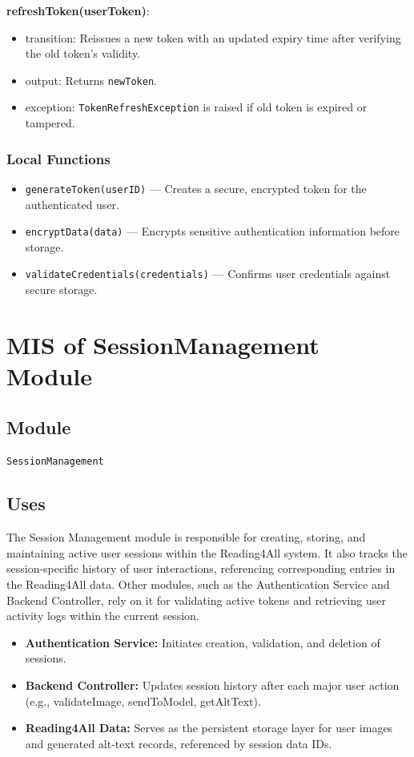 \documentclass[12pt, titlepage]{article}
\begin{document}
\noindent \textbf{refreshToken(userToken)}:
\begin{itemize}
  \item transition: Reissues a new token with an updated expiry time
    after verifying the old token’s validity.
  \item output: Returns \texttt{newToken}.
  \item exception: \texttt{TokenRefreshException} is raised if old
    token is expired or tampered.
\end{itemize}

\subsubsection{Local Functions}
\begin{itemize}
  \item \texttt{generateToken(userID)} — Creates a secure, encrypted
    token for the authenticated user.
  \item \texttt{encryptData(data)} — Encrypts sensitive
    authentication information before storage.
  \item \texttt{validateCredentials(credentials)} — Confirms user
    credentials against secure storage.
\end{itemize}

\section{MIS of SessionManagement Module} \label{Module:SessionManagement}

\subsection{Module}
\texttt{SessionManagement}

\subsection{Uses}
The Session Management module is responsible for creating, storing,
and maintaining active user sessions within the Reading4All system.
It also tracks the session-specific history of user interactions,
referencing corresponding entries in the Reading4All data. Other
modules, such as the Authentication Service and Backend Controller,
rely on it for validating active tokens and retrieving user activity
logs within the current session.
\begin{itemize}
  \item \textbf{Authentication Service:} Initiates creation,
    validation, and deletion of sessions.
  \item \textbf{Backend Controller:} Updates session history after
    each major user action (e.g., validateImage, sendToModel, getAltText).
  \item \textbf{Reading4All Data:} Serves as the persistent storage
    layer for user images and generated alt-text records, referenced
    by session data IDs.
\end{itemize}
\end{document}
